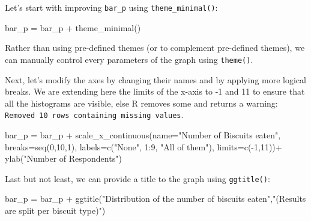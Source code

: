 \documentclass[
]{book}
\newenvironment{Shaded}{\begin{snugshade}}{\end{snugshade}}
\newcommand{\AttributeTok}[1]{\textcolor[rgb]{0.77,0.63,0.00}{#1}}
\newcommand{\DecValTok}[1]{\textcolor[rgb]{0.00,0.00,0.81}{#1}}
\newcommand{\FunctionTok}[1]{\textcolor[rgb]{0.00,0.00,0.00}{#1}}
\newcommand{\NormalTok}[1]{#1}
\newcommand{\OtherTok}[1]{\textcolor[rgb]{0.56,0.35,0.01}{#1}}
\newcommand{\SpecialCharTok}[1]{\textcolor[rgb]{0.00,0.00,0.00}{#1}}
\newcommand{\StringTok}[1]{\textcolor[rgb]{0.31,0.60,0.02}{#1}}
\begin{document}
Let's start with improving \texttt{bar\_p} using \texttt{theme\_minimal()}:

\begin{Shaded}
\begin{Highlighting}[]
\NormalTok{bar\_p }\OtherTok{=}\NormalTok{ bar\_p }\SpecialCharTok{+} \FunctionTok{theme\_minimal}\NormalTok{()}
\end{Highlighting}
\end{Shaded}

Rather than using pre-defined themes (or to complement pre-defined themes), we can manually control every parameters of the graph using \texttt{theme()}.

Next, let's modify the axes by changing their names and by applying more logical breaks. We are extending here the limits of the x-axis to -1 and 11 to ensure that all the histograms are visible, else R removes some and returns a warning: \texttt{Removed\ 10\ rows\ containing\ missing\ values}.

\begin{Shaded}
\begin{Highlighting}[]
\NormalTok{bar\_p }\OtherTok{=}\NormalTok{ bar\_p }\SpecialCharTok{+}
  \FunctionTok{scale\_x\_continuous}\NormalTok{(}\AttributeTok{name=}\StringTok{"Number of Biscuits eaten"}\NormalTok{, }
                     \AttributeTok{breaks=}\FunctionTok{seq}\NormalTok{(}\DecValTok{0}\NormalTok{,}\DecValTok{10}\NormalTok{,}\DecValTok{1}\NormalTok{), }
                     \AttributeTok{labels=}\FunctionTok{c}\NormalTok{(}\StringTok{"None"}\NormalTok{, }\DecValTok{1}\SpecialCharTok{:}\DecValTok{9}\NormalTok{, }\StringTok{"All of them"}\NormalTok{), }
                     \AttributeTok{limits=}\FunctionTok{c}\NormalTok{(}\SpecialCharTok{{-}}\DecValTok{1}\NormalTok{,}\DecValTok{11}\NormalTok{))}\SpecialCharTok{+}
  \FunctionTok{ylab}\NormalTok{(}\StringTok{"Number of Respondents"}\NormalTok{)}
\end{Highlighting}
\end{Shaded}

Last but not least, we can provide a title to the graph using \texttt{ggtitle()}:

\begin{Shaded}
\begin{Highlighting}[]
\NormalTok{bar\_p }\OtherTok{=}\NormalTok{ bar\_p }\SpecialCharTok{+}
  \FunctionTok{ggtitle}\NormalTok{(}\StringTok{"Distribution of the number of biscuits eaten"}\NormalTok{,}\StringTok{"(Results are split per biscuit type)"}\NormalTok{)}
\end{Highlighting}
\end{Shaded}
\end{document}

